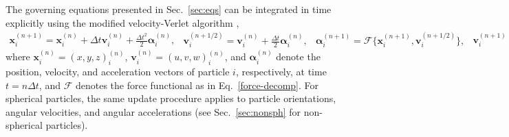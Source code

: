 The governing equations presented in Sec.\ \ref{sec:eqs} can be integrated in time explicitly using the modified velocity-Verlet algorithm \citep{Groot_Warren_1997},
\begin{subequations}
  \begin{equation} 
    \begin{aligned}
      {\bm x}_i^{(n+1)} = {\bm x}_i^{(n)}+\Delta t {\bm v}_i^{(n)} + \frac{\Delta t^2}{2} {\bm \alpha}_i^{(n)},
    \end{aligned} \label{verlect 1}
  \end{equation}
  \begin{equation} 
    \begin{aligned}
      {\bm v}_i^{(n+1/2)} = {\bm v}_i^{(n)}+ \frac{\Delta t}{2} {\bm \alpha}_i^{(n)},
    \end{aligned} \label{verlect 2}
  \end{equation}
  \begin{equation} 
    \begin{aligned}
      {\bm \alpha}_i^{(n+1)} = \mathcal{F} \bigg\{{\bm x}_i^{(n+1)}, {\bm v}_i^{(n+1/2)} \bigg\},
    \end{aligned} \label{verlect 3}
  \end{equation}
  \begin{equation} 
    \begin{aligned}
      {\bm v}_i^{(n+1)} = {\bm v}_i^{(n)}+ \frac{\Delta t}{2} \bigg({\bm \alpha}_i^{(n)} + {\bm \alpha}_i^{(n+1)} \bigg),
    \end{aligned} \label{verlect 4}
  \end{equation}
\end{subequations}
where ${\bm x}_i^{(n)}=(x,y,z)_i^{(n)}$, ${\bm v}_i^{(n)}=(u,v,w)_i^{(n)}$, and ${\bm \alpha}_i^{(n)}$ denote the position, velocity, and acceleration vectors of particle $i$, respectively, at time $t=n\Delta t$, and $\mathcal{F}$ denotes the force functional as in Eq.\ \eqref{force-decomp}. For spherical particles, the same update procedure applies to particle orientations, angular velocities, and angular accelerations (see Sec.\ \ref{sec:nonsph} for non-spherical particles).

